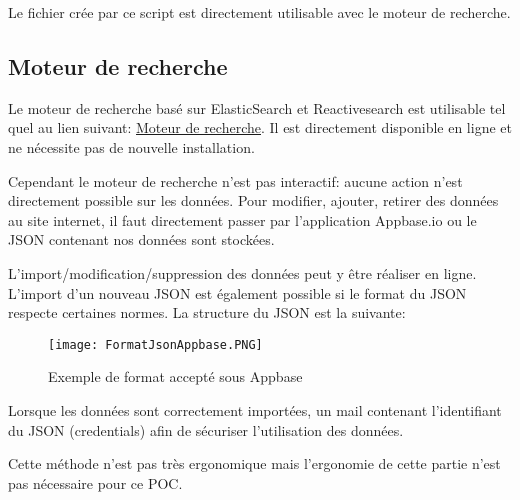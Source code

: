 Le fichier crée par ce script est directement utilisable avec le moteur de recherche.

\subsection{Moteur de recherche}
Le moteur de recherche basé sur ElasticSearch et Reactivesearch est utilisable tel quel au lien suivant: \href{https://ujcqr.csb.app}{Moteur de recherche}.
Il est directement disponible en ligne et ne nécessite pas de nouvelle installation.

Cependant le moteur de recherche n'est pas interactif: aucune action n'est directement possible sur les données.
Pour modifier, ajouter, retirer des données au site internet, il faut directement passer par l'application Appbase.io ou le JSON contenant nos données sont stockées.

L'import/modification/suppression des données peut y être réaliser en ligne.
L'import d'un nouveau JSON est également possible si le format du JSON respecte certaines normes. 
La structure du JSON est la suivante:

\begin{figure}[h!]
  \centering
	\texttt{[image: FormatJsonAppbase.PNG]}
	\caption[]{Exemple de format accepté sous Appbase}
	\label{}
\end{figure}

Lorsque les données sont correctement importées, un mail contenant l'identifiant du JSON (credentials) afin de sécuriser l'utilisation des données. 

Cette méthode n'est pas très ergonomique mais l'ergonomie de cette partie n'est pas nécessaire pour ce POC\@.
